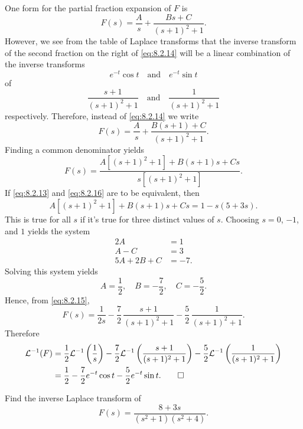 \begin{solution}
One  form for the partial fraction expansion of $F$ is
\begin{equation}\label{eq:8.2.14}
F(s)=\frac{A}{s}+\frac{Bs+C}{(s+1)^2+1}.
\end{equation}
However, we see from the table of Laplace transforms that the inverse
transform of the second fraction on the right of \eqref{eq:8.2.14} will be
a linear combination of the inverse transforms
\[
e^{-t}\cos t\quad\text{and}\quad e^{-t}\sin t
\]
of
\[
\frac{s+1}{(s+1)^2+1}\quad\text{and}\quad \frac{1}{(s+1)^2+1}
\]
respectively. Therefore, instead of \eqref{eq:8.2.14} we write
\begin{equation}\label{eq:8.2.15}
F(s)=\frac{A}{s}+\frac{B(s+1)+C}{(s+1)^2+1}.
\end{equation}
Finding a common denominator yields
\begin{equation}\label{eq:8.2.16}
F(s)=\frac{A\left[(s+1)^2+1\right]+B(s+1)s+Cs}{s\left[(s+1)^2+1\right]}.
\end{equation}
If  \eqref{eq:8.2.13} and  \eqref{eq:8.2.16} are to be equivalent, then
\[
A\left[(s+1)^2+1\right]+B(s+1)s+Cs=1-s(5+3s).
\]
This is true for all $s$ if it's true for three distinct values of
$s$.  Choosing $s=0$, $-1$, and $1$ yields the system
\begin{align*}
2A&=1\\
A-C&=3\\
5A+2B+C&=-7.
\end{align*}
Solving this system yields
\[
A=\frac{1}{2},\quad B=-\frac{7}{2},\quad C=-\frac{5}{2}.
\]
Hence, from  \eqref{eq:8.2.15},
\[
F(s)=\frac{1}{2s}-\frac{7}{2}\,\frac{s+1}{(s+1)^2+1}-
\frac{5}{2}\,\frac{1}{(s+1)^2+1}.
\]
Therefore
\begin{align*}
{\mathcal L}^{-1}(F)
&=\frac{1}{2}{\mathcal L}^{-1}\left(\frac{1}{s}\right)
-\frac{7}{2}{\mathcal L}^{-1}\left(\frac{s+1}{(s+1)^2+1}\right)
-\frac{5}{2} {\mathcal L}^{-1}\left(\frac{1}{(s+1)^2+1}\right)\\
&=\frac{1}{2}-\frac{7}{2}e^{-t}\cos t-\frac{5}{2}e^{-t}\sin t.\qedhere
\end{align*}
\end{solution}

\begin{example}\label{example:8.2.9}
Find the inverse Laplace transform of
\begin{equation}\label{eq:8.2.17}
F(s)=\frac{8+3s}{(s^2+1)(s^2+4)}.
\end{equation}
\end{example}


